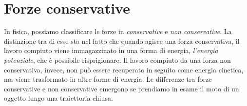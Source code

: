 %
%
%

\section{Forze conservative}
In fisica, possiamo classificare le forze in \textit{conservative} e \textit{non
conservative}. La distinzione tra di esse sta nel fatto che quando agisce una
forza conservativa, il lavoro compiuto viene immagazzinato in una forma di energia,
\textit{l'energia potenziale}, che è possibile risprigionare. Il lavoro compiuto
da una forza non conservativa, invece, non può essere recuperato in seguito come
energia cinetica, ma viene trasformato in altre forme di energia. Le differenze tra
forze conservative e non conservative emergono se prendiamo in esame il moto di un
oggetto lungo una traiettoria chiusa.

